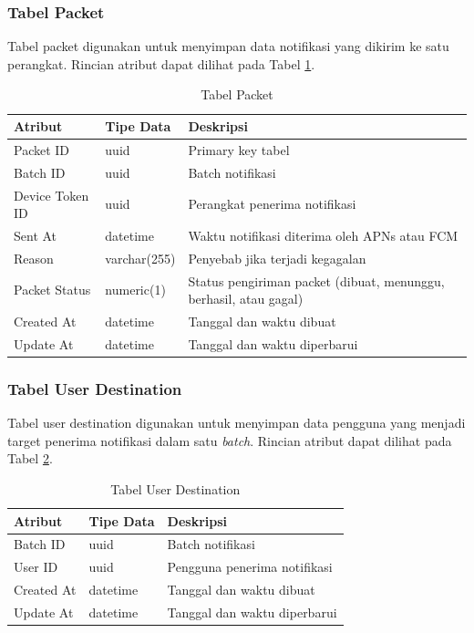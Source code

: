 \subsubsection{Tabel Packet} \label{s:tabel_packet}
\par Tabel packet digunakan untuk menyimpan data notifikasi yang dikirim ke satu perangkat. Rincian atribut dapat dilihat pada Tabel \ref{tabel_packet}.
\begin{longtable}{|p{2cm}|p{2.5cm}|p{4.5cm}|}
	\caption{Tabel Packet} \label{tabel_packet} \\ \hline
    {Atribut} & {Tipe Data} & {Deskripsi} \\ \hline
    Packet ID & uuid & Primary key tabel \\ \hline
    Batch ID & uuid & Batch notifikasi \\ \hline
    Device Token ID & uuid & Perangkat penerima notifikasi \\ \hline
    Sent At & datetime & Waktu notifikasi diterima oleh APNs atau FCM \\ \hline
    Reason & varchar(255) & Penyebab jika terjadi kegagalan \\ \hline
    Packet Status & numeric(1) & Status pengiriman packet (dibuat, menunggu, berhasil, atau gagal) \\ \hline
    Created At & datetime & Tanggal dan waktu dibuat \\ \hline
    Update At & datetime & Tanggal dan waktu diperbarui \\ \hline
\end{longtable}

\subsubsection{Tabel User Destination}
\par Tabel user destination digunakan untuk menyimpan data pengguna yang menjadi target penerima notifikasi dalam satu \textit{batch}. Rincian atribut dapat dilihat pada Tabel \ref{tabel_user_destination}.
\begin{longtable}{|p{2cm}|p{2.5cm}|p{4.5cm}|}
	\caption{Tabel User Destination} \label{tabel_user_destination} \\ \hline
    {Atribut} & {Tipe Data} & {Deskripsi} \\ \hline
    Batch ID & uuid & Batch notifikasi \\ \hline
    User ID & uuid & Pengguna penerima notifikasi \\ \hline
    Created At & datetime & Tanggal dan waktu dibuat \\ \hline
    Update At & datetime & Tanggal dan waktu diperbarui \\ \hline
\end{longtable}

